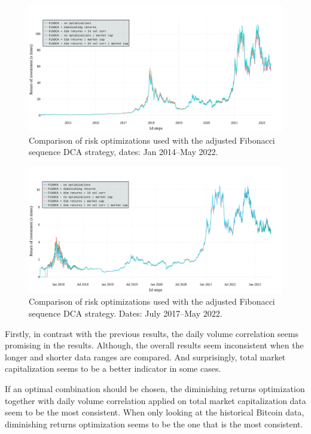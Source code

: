 \begin{figure}[!t]
    \centering
    \includegraphics[width=\columnwidth]{figures/evaluation-dca-optimization-longer.pdf}
    \caption{Comparison of risk optimizations used with the adjusted Fibonacci sequence DCA strategy, dates: Jan 2014--May 2022.}
    \label{figure-dca-optimization-longer}
\end{figure}

\begin{figure}[!t]
    \centering
    \includegraphics[width=\columnwidth]{figures/evaluation-dca-optimization-shorter.pdf}
    \caption{Comparison of risk optimizations used with the adjusted Fibonacci sequence DCA strategy. Dates: July 2017--May 2022.}
    \label{figure-dca-optimization-shorter}
\end{figure}

Firstly, in contrast with the previous results, the daily volume correlation seems promising in the results. Although, the overall results seem inconsistent when the longer and shorter data ranges are compared. And surprisingly, total market capitalization seems to be a better indicator in some cases.

If an optimal combination should be chosen, the diminishing returns optimization together with daily volume correlation applied on total market capitalization data seem to be the most consistent. When only looking at the historical Bitcoin data, diminishing returns optimization seems to be the one that is the most consistent.


